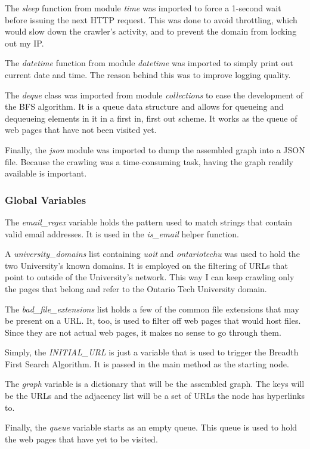 The \textit{sleep} function from module \textit{time} was imported to force a 1-second wait before issuing the next HTTP request. This was done to avoid throttling, which would slow down the crawler's activity, and to prevent the domain from locking out my IP.

The \textit{datetime} function from module \textit{datetime} was imported to simply print out current date and time. The reason behind this was to improve logging quality.

The \textit{deque} class was imported from module \textit{collections} to ease the development of the BFS algorithm. It is a queue data structure and allows for queueing and dequeueing elements in it in a first in, first out scheme. It works as the queue of web pages that have not been visited yet.

Finally, the \textit{json} module was imported to dump the assembled graph into a JSON file. Because the crawling was a time-consuming task, having the graph readily available is important.

\subsubsection{Global Variables}
The \textit{email\_regex} variable holds the pattern used to match strings that contain valid email addresses. It is used in the \textit{is\_email} helper function.

A \textit{university\_domains} list containing \textit{uoit} and \textit{ontariotechu} was used to hold the two University's known domains. It is employed on the filtering of URLs that point to outside of the University's network. This way I can keep crawling only the pages that belong and refer to the Ontario Tech University domain.

The \textit{bad\_file\_extensions} list holds a few of the common file extensions that may be present on a URL. It, too, is used to filter off web pages that would host files. Since they are not actual web pages, it makes no sense to go through them.

Simply, the \textit{INITIAL\_URL} is just a variable that is used to trigger the Breadth First Search Algorithm. It is passed in the main method as the starting node.

The \textit{graph} variable is a dictionary that will be the assembled graph. The keys will be the URLs and the adjacency list will be a set of URLs the node has hyperlinks to.

Finally, the \textit{queue} variable starts as an empty queue. This queue is used to hold the web pages that have yet to be visited.


